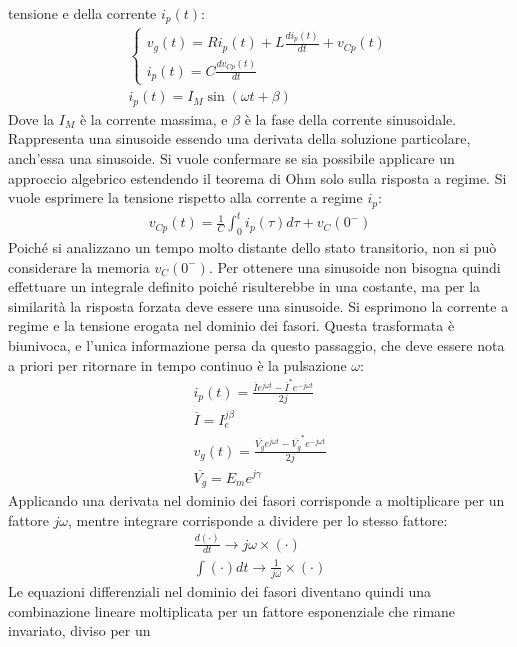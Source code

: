\documentclass{article}
\numberwithin{equation}{subsection}
\begin{document}
tensione e della corrente $i_p(t)$:
\begin{gather*}
    \begin{cases}
        v_g(t)=Ri_p(t)+\displaystyle L\frac{di_p(t)}{dt}+v_{Cp}(t)\\
        i_p(t)=\displaystyle C\frac{dv_{Cp}(t)}{dt}
    \end{cases}\\
    i_p(t)=I_M\sin(\omega t+\beta)
\end{gather*}
Dove la $I_M$ è la corrente massima, e $\beta$ è la fase della corrente sinusoidale. Rappresenta una sinusoide essendo una derivata della soluzione particolare, anch'essa 
una sinusoide. Si vuole confermare se sia possibile applicare un approccio algebrico estendendo il 
teorema di Ohm solo sulla risposta a regime. Si vuole esprimere la tensione rispetto alla corrente a regime $i_p$:
\begin{gather*}
    v_{Cp}(t)=\displaystyle\frac{1}{C}\int_{0}^{t}i_p(\tau)d\tau+v_C(0^-)
\end{gather*}
Poiché si analizzano un tempo molto distante dello stato transitorio, non si può considerare la memoria $v_C(0^-)$. Per ottenere una sinusoide non bisogna quindi effettuare 
un integrale definito poiché risulterebbe in una costante, ma per la similarità la risposta forzata deve essere una sinusoide. 
Si esprimono la corrente a regime e la tensione erogata nel dominio dei fasori. Questa trasformata è biunivoca, e l'unica informazione persa da questo passaggio, che deve 
essere nota a priori per ritornare in tempo continuo è la pulsazione $\omega$:
\begin{gather*}
    i_p(t)=\displaystyle\frac{\overline{I}e^{j\omega t}-\overline{I}^*e^{-j\omega t}}{2j}\\
    \overline{I}=I_e^{j\beta}\\
    v_{g}(t)=\displaystyle\frac{\overline{V_g}e^{j\omega t}-\overline{V_g}^*e^{-j\omega t}}{2j}\\
    \overline{V_g}=E_me^{j\gamma}
\end{gather*}
Applicando una derivata nel dominio dei fasori corrisponde a moltiplicare per un fattore $j\omega$, mentre integrare corrisponde a dividere per lo stesso 
fattore:
\begin{gather*}
    \displaystyle\frac{d(\cdot)}{dt}\to j\omega\times(\cdot)\\
    \displaystyle\int (\cdot)dt\to\displaystyle\frac{1}{j\omega}\times(\cdot)
\end{gather*}
Le equazioni differenziali nel dominio dei fasori diventano quindi una combinazione lineare moltiplicata per un fattore esponenziale che rimane invariato, diviso per un 
\end{document}
